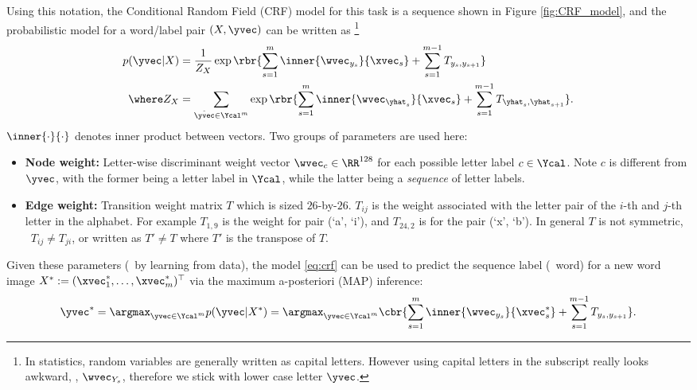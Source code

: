 \documentclass[11pt]{report}
\begin{document}
Using this notation, the Conditional Random Field (CRF) model for this task is a sequence shown in Figure \ref{fig:CRF_model},
and the probabilistic model for a word/label pair $(X, \yvec)$ can be written as%
\footnote{In statistics, random variables are generally written as capital letters.
However using capital letters in the subscript really looks awkward, \eg, $\wvec_{Y_s}$,
therefore we stick with lower case letter $\yvec$.}
\begin{align}
	\label{eq:crf}
	p(\yvec | X ) &= \frac{1}{Z_X} \exp \rbr{\sum_{s=1}^m \inner{\wvec_{y_s}}{\xvec_s} + \sum_{s=1}^{m-1} T_{y_s, y_{s+1}}} \\
	\where Z_X &= \sum_{\hat{\yvec} \in \Ycal^m} \exp \rbr{\sum_{s=1}^m \inner{\wvec_{\yhat_s}}{\xvec_s} + \sum_{s=1}^{m-1} T_{\yhat_s, \yhat_{s+1}}}.
\end{align}
%
$\inner{\cdot}{\cdot}$ denotes inner product between vectors.
Two groups of parameters are used here:

\vspace{-1em}
\begin{itemize}
	\item {\bf Node weight:} Letter-wise discriminant weight vector $\wvec_c \in \RR^{128}$ for each possible letter label $c \in \Ycal$.
	Note $c$ is different from $\yvec$,
	with the former being a letter label in $\Ycal$,
	while the latter being a \textit{sequence} of letter labels.
	\item {\bf Edge weight:} Transition weight matrix $T$ which is sized $26$-by-$26$.
	$T_{ij}$ is the weight associated with the letter pair of the $i$-th and $j$-th letter in the alphabet.  For example $T_{1,9}$ is the weight for pair (`a', `i'), and $T_{24,2}$ is for the pair (`x', `b'). In general $T$ is not symmetric, \ie\ $T_{ij} \neq T_{ji}$, or written as $T' \neq T$ where $T'$ is the transpose of $T$.
\end{itemize}

Given these parameters (\eg\ by learning from data), the model \eqref{eq:crf} can be used to predict the sequence label (\ie\ word) for a new word image $X^* := (\xvec^*_1, \ldots, \xvec^*_m)^\top$ via the maximum a-posteriori (MAP) inference:
\begin{align}
	\label{eq:crf_decode}
	\yvec^* = \argmax_{\yvec \in \Ycal^m} p(\yvec | X^*)
	= \argmax_{\yvec \in \Ycal^m} \cbr{ \sum_{s=1}^m \inner{\wvec_{y_s}}{\xvec^*_s} + \sum_{s=1}^{m-1} T_{y_s, y_{s+1}}}.
\end{align}
\end{document}
